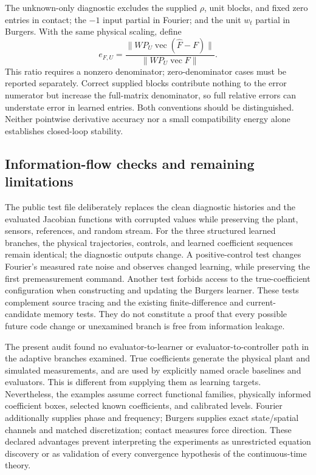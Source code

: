 \documentclass[journal]{IEEEtran}
\begin{document}
The unknown-only diagnostic excludes the supplied $\rho$, unit blocks,
and fixed zero entries in contact; the $-1$ input partial in Fourier;
and the unit $w_t$ partial in Burgers. With the same physical scaling,
define
\begin{equation}
 e_{F,U}=\frac{\|WP_U\operatorname{vec}(\widehat F-F)\|}
 {\|WP_U\operatorname{vec}F\|}.
 \label{eq:audit_unknown_only}
\end{equation}
This ratio requires a nonzero denominator; zero-denominator cases must
be reported separately. Correct supplied blocks contribute nothing to
the error numerator but increase the full-matrix denominator, so full
relative errors can understate error in learned entries. Both conventions
should be distinguished. Neither pointwise derivative accuracy nor a
small compatibility energy alone establishes closed-loop stability.

\subsection{Information-flow checks and remaining limitations}
The public test file 
deliberately replaces the clean diagnostic histories and the evaluated
Jacobian functions with corrupted values while preserving the plant,
sensors, references, and random stream. For the three structured learned branches,
the physical trajectories, controls, and learned coefficient sequences
remain identical; the diagnostic outputs change. A positive-control test
changes Fourier's measured rate noise and observes changed learning,
while preserving the first premeasurement command. Another test forbids
access to the true-coefficient configuration when constructing and
updating the Burgers learner. These tests complement source tracing and
the existing finite-difference and current-candidate memory tests. They
do not constitute a proof that every possible future code change or
unexamined branch is free from information leakage.

The present audit found no evaluator-to-learner or evaluator-to-controller
path in the adaptive branches examined. True coefficients generate the
physical plant and simulated measurements, and are used by explicitly
named oracle baselines and evaluators. This is different from supplying
them as learning targets. Nevertheless, the examples assume correct
functional families, physically informed coefficient boxes, selected
known coefficients, and calibrated levels. Fourier additionally supplies
phase and frequency; Burgers supplies exact state/spatial channels and
matched discretization; contact measures force direction. These declared
advantages prevent interpreting the experiments as unrestricted equation
discovery or as validation of every convergence hypothesis of the
continuous-time theory.
%
\newtheorem{directproposition}{Proposition}
\renewcommand{\thedirectproposition}{S.D\arabic{directproposition}}
\end{document}
